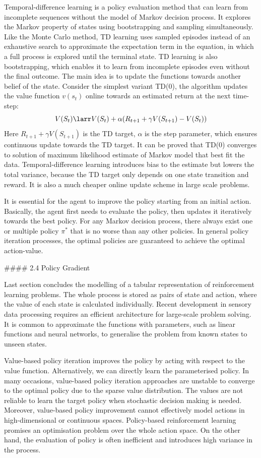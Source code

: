 \documentclass[twoside,12pt,a4paper]{article}
\begin{document}
Temporal-difference learning is a policy evaluation method that can learn from incomplete sequences without the model of Markov decision process. It explores the Markov property of states using bootstrapping and sampling simultaneously. Like the Monte Carlo method, TD learning uses sampled episodes instead of an exhaustive search to approximate the expectation term in the equation, in which a full process is explored until the terminal state. TD learning is also bootstrapping, which enables it to learn from incomplete episodes even without the final outcome. The main idea is to update the functions towards another belief of the state. Consider the simplest variant TD(0), the algorithm updates the value function $v(s_t)$ online towards an estimated return at the next time-step:
$$
V(S_t)\larr V(S_t)+\alpha(R_{t+1}+\gamma V(S_{t+1})-V(S_t))
$$
Here $R_{t+1}+\gamma V(S_{t+1})$ is the TD target, $\alpha$ is the step parameter, which ensures continuous update towards the TD target. It can be proved that TD(0) converges to solution of maximum likelihood estimate of Markov model that best fit the data. Temporal-difference learning introduces bias to the estimate but lowers the total variance, because the TD target only depends on one state transition and reward. It is also a much cheaper online update scheme in large scale problems.

It is essential for the agent to improve the policy starting from an initial action. Basically, the agent first needs to evaluate the policy, then updates it iteratively towards the best policy. For any Markov decision process, there always exist one or multiple policy $\pi^*$ that is no worse than any other policies. In general policy iteration processes, the optimal policies are guaranteed to achieve the optimal action-value.



#### 2.4 Policy Gradient

Last section concludes the modelling of a tabular representation of reinforcement learning problems. The whole process is stored as pairs of state and action, where the value of each state is calculated individually. Recent development in sensory data processing requires an efficient architecture for large-scale problem solving. It is common to approximate the functions with parameters, such as linear functions and neural networks, to generalise the problem from known states to unseen states.

Value-based policy iteration improves the policy by acting with respect to the value function. Alternatively, we can directly learn the parameterised policy. In many occasions, value-based policy iteration approaches are unstable to converge to the optimal policy due to the sparse value distribution. The values are not reliable to learn the target policy when stochastic decision making is needed. Moreover, value-based policy improvement cannot effectively model actions in high-dimensional or continuous spaces. Policy-based reinforcement learning promises an optimisation problem over the whole action space. On the other hand, the evaluation of policy is often inefficient and introduces high variance in the process.
\end{document}
